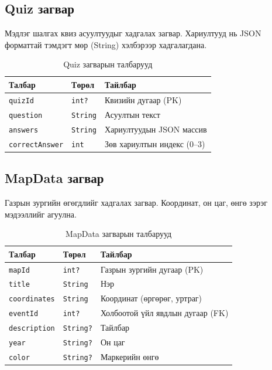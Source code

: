 \subsection{Quiz загвар}

Мэдлэг шалгах квиз асуултуудыг хадгалах загвар. Хариултууд нь JSON форматтай тэмдэгт мөр (String) хэлбэрээр хадгалагдана.

\begin{table}[htbp]
\centering
\begin{tabular}{|p{3.5cm}|p{2.5cm}|p{7.5cm}|}
\hline
\textbf{Талбар} & \textbf{Төрөл} & \textbf{Тайлбар} \\
\hline
\texttt{quizId} & \texttt{int?} & Квизийн дугаар (PK) \\
\hline
\texttt{question} & \texttt{String} & Асуултын текст \\
\hline
\texttt{answers} & \texttt{String} & Хариултуудын JSON массив \\
\hline
\texttt{correctAnswer} & \texttt{int} & Зөв хариултын индекс (0--3) \\
\hline
\end{tabular}
\caption{Quiz загварын талбарууд}
\label{tab:quiz_model}
\end{table}

\subsection{MapData загвар}

Газрын зургийн өгөгдлийг хадгалах загвар. Координат, он цаг, өнгө зэрэг мэдээллийг агуулна.

\begin{table}[htbp]
\centering
\begin{tabular}{|p{3cm}|p{3cm}|p{7.5cm}|}
\hline
\textbf{Талбар} & \textbf{Төрөл} & \textbf{Тайлбар} \\
\hline
\texttt{mapId} & \texttt{int?} & Газрын зургийн дугаар (PK) \\
\hline
\texttt{title} & \texttt{String} & Нэр \\
\hline
\texttt{coordinates} & \texttt{String} & Координат (өргөрөг, уртраг) \\
\hline
\texttt{eventId} & \texttt{int?} & Холбоотой үйл явдлын дугаар (FK) \\
\hline
\texttt{description} & \texttt{String?} & Тайлбар \\
\hline
\texttt{year} & \texttt{String?} & Он цаг \\
\hline
\texttt{color} & \texttt{String?} & Маркерийн өнгө \\
\hline
\end{tabular}
\caption{MapData загварын талбарууд}
\label{tab:mapdata_model}
\end{table}

